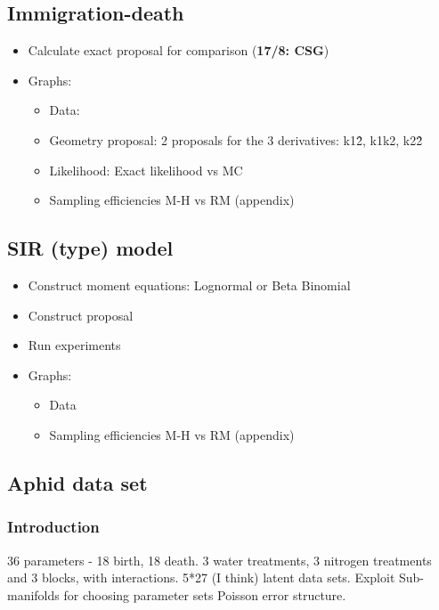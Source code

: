 \documentclass{pnastwo}
\begin{document}
\begin{article}
\subsection{Immigration-death}

  \begin{itemize}
  \item Calculate exact proposal for comparison (\textbf{17/8: CSG})
  \item Graphs:
    \begin{itemize}
    \item Data:
    \item Geometry proposal: 2 proposals for the 3 derivatives: k1\^2, k1k2, k2\^2
    \item Likelihood: Exact likelihood vs MC
    \item Sampling efficiencies M-H vs RM (appendix)
    \end{itemize}
  \end{itemize} 
  
\subsection{SIR (type) model}


    \begin{itemize}
    \item Construct moment equations:  Lognormal or Beta Binomial
    \item Construct proposal
    \item Run experiments
    \item Graphs:
      \begin{itemize}
      \item Data
      \item Sampling efficiencies M-H vs RM (appendix)
      \end{itemize}
    \end{itemize}

\subsection{Aphid data set}

\subsubsection{Introduction}

36 parameters - 18 birth, 18 death. 3 water treatments, 3 nitrogen treatments
and 3 blocks, with interactions. 5*27 (I think) latent data sets. Exploit Sub-manifolds for choosing parameter sets
Poisson error structure. 



\end{article}
\end{document}
